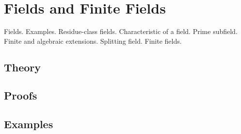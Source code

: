 
\section{Fields and Finite Fields}
\label{sec:2.2.15-fields-finite}

\begin{ticket}
Fields. Examples. Residue-class fields. Characteristic of a field. Prime subfield. Finite and algebraic extensions. Splitting field. Finite fields.
\end{ticket}

\subsection*{Theory}

\subsection*{Proofs}

\subsection*{Examples}
